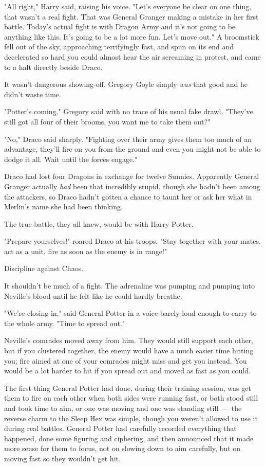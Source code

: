 "All right," Harry said, raising his voice. "Let's everyone be clear on one
thing, that wasn't a real fight. That was General Granger making a mistake in
her first battle. Today's actual fight is with Dragon Army and it's not going
to be anything like this. It's going to be a lot more fun. Let's move out."
\sbreak
A broomstick fell out of the sky, approaching terrifyingly fast, and spun on
its end and decelerated so hard you could almost hear the air screaming in
protest, and came to a halt directly beside Draco.

It wasn't dangerous showing-off. Gregory Goyle simply \emph{was} that good and
he didn't waste time.

"Potter's coming," Gregory said with no trace of his usual fake drawl. "They've
still got all four of their brooms, you want me to take them out?"

"No," Draco said sharply. "Fighting over their army gives them too much of an
advantage, they'll fire on you from the ground and even you might not be able
to dodge it all. Wait until the forces engage."

Draco had lost four Dragons in exchange for twelve Sunnies. Apparently General
Granger actually \emph{had} been that incredibly stupid, though she hadn't been
among the attackers, so Draco hadn't gotten a chance to taunt her or ask her
what in Merlin's name she had been thinking.

The true battle, they all knew, would be with Harry Potter.

"Prepare yourselves!" roared Draco at his troops. "Stay together with your
mates, act as a unit, fire as soon as the enemy is in range!"

Discipline against Chaos.

It shouldn't be much of a fight.
\sbreak
The adrenaline was pumping and pumping into Neville's blood until he felt like
he could hardly breathe.

"We're closing in," said General Potter in a voice barely loud enough to carry
to the whole army. "Time to spread out."

Neville's comrades moved away from him. They would still support each other,
but if you clustered together, the enemy would have a much easier time hitting
you; fire aimed at one of your comrades might miss and get you instead. You
would be a lot harder to hit if you spread out and moved as fast as you could.

The first thing General Potter had done, during their training session, was get
them to fire on each other when both sides were running fast, or both stood
still and took time to aim, or one was moving and one was standing still~--- the
reverse charm to the Sleep Hex was simple, though you weren't allowed to use it
during real battles. General Potter had carefully recorded everything that
happened, done some figuring and ciphering, and then announced that it made
more sense for them to focus, not on slowing down to aim carefully, but on
moving fast so they wouldn't get hit.

